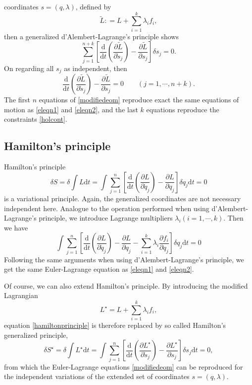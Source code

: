 \documentclass[preprint,11pt]{elsarticle}
\newcommand{\mathd}{\mathrm{d}}
\begin{document}
coordinates $s = ( q, \lambda)$, defined by
\[ \tilde{L} : = L + \sum_{i = 1}^k \lambda_i f_i, \]
then a generalized d'Alembert-Lagrange's principle shows
\begin{equation}
  \sum_{j=1}^{n+k}\left[\frac{\mathd}{\mathd t} \left( \frac{\partial \tilde{L}}{\partial \dot{s}_j}
  \right) - \frac{\partial \tilde{L}}{\partial s_j}\right] \delta s_j = 0.
\end{equation}
On regarding all $s_j$ as independent, then
\begin{equation}
  \frac{\mathd}{\mathd t} \left( \frac{\partial \tilde{L}}{\partial \dot{s}_j}
  \right) - \frac{\partial \tilde{L}}{\partial s_j} = 0 \hspace{2em} ( j = 1,
  \cdots, n + k) . \label{modifiedeom}
\end{equation}
The first $n$ equations of \eqref{modifiedeom} reproduce exact the same equations of motion as \eqref{eleqn1} and \eqref{eleqn2}, and the last $k$ equations
reproduce the constraints \eqref{holcont}.

\subsection{Hamilton's principle}
Hamilton's principle
\begin{equation}
  \delta S = \delta \int L \mathd t = \int \sum_{j = 1}^n \left[
  \frac{\mathd}{\mathd t} \left( \frac{\partial L}{\partial \dot{q}_j} \right)
  - \frac{\partial L}{\partial q_j}  \right] \delta q_j \mathd t = 0
  \label{hamiltonprinciple}
\end{equation}
is a variational principle. Again, the generalized coordinates are not necessary independent here.
Analogue to the operation performed when using d'Alembert-Lagrange's principle, we introduce Lagrange multipliers $\lambda_i(i=1,\cdots,k)$. Then we have
\begin{equation}
 \int \sum_{j = 1}^n \left[
  \frac{\mathd}{\mathd t} \left( \frac{\partial L}{\partial \dot{q}_j} \right)
  - \frac{\partial L}{\partial q_j} - \sum_{i = 1}^k \lambda_i \frac{\partial
  f_i}{\partial q_j}\right] \delta q_j \mathd t = 0
\end{equation}
Following the same arguments when using d'Alembert-Lagrange's principle, we get the same Euler-Lagrange equation as \eqref{eleqn1} and \eqref{eleqn2}.

Of course, we can also extend Hamilton's principle. By introducing the modified Lagrangian
\begin{equation}
  L^\star = L + \sum_{i = 1}^k \lambda_i f_i,
\end{equation}
equation \eqref{hamiltonprinciple} is therefore replaced by so called Hamilton's generalized principle,
\begin{equation}\label{genhamiltonprinciple}
  \delta S^\star = \delta \int L^\star \mathd t = \int \sum_{j = 1}^n \left[
  \frac{\mathd}{\mathd t} \left( \frac{\partial L^\star}{\partial \dot{s}_j} \right)
  - \frac{\partial L^\star}{\partial s_j}  \right] \delta s_j \mathd t = 0,
\end{equation}
from which the Euler-Lagrange equations \eqref{modifiedeom} can be reproduced for the independent variations of the extended set of coordinates $s=(q,\lambda)$.
\end{document}
